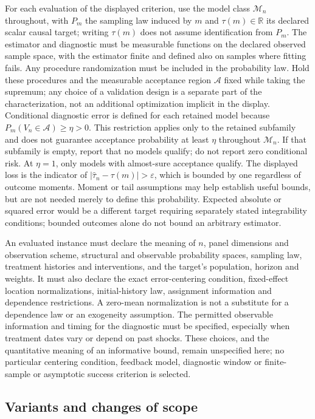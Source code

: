 \documentclass[11pt,a4paper]{article}
\newcommand{\R}{\mathbb R}
\begin{document}
For each evaluation of the displayed criterion, use the model class $\mathcal M_n$ throughout, with $P_m$ the sampling law induced by $m$ and $\tau(m)\in\R$ its declared scalar causal target; writing $\tau(m)$ does not assume identification from $P_m$. The estimator and diagnostic must be measurable functions on the declared observed sample space, with the estimator finite and defined also on samples where fitting fails. Any procedure randomization must be included in the probability law. Hold these procedures and the measurable acceptance region $\mathcal A$ fixed while taking the supremum; any choice of a validation design is a separate part of the characterization, not an additional optimization implicit in the display. Conditional diagnostic error is defined for each retained model because $P_m(V_n\in\mathcal A)\geq\eta>0$. This restriction applies only to the retained subfamily and does not guarantee acceptance probability at least $\eta$ throughout $\mathcal M_n$. If that subfamily is empty, report that no models qualify; do not report zero conditional risk. At $\eta=1$, only models with almost-sure acceptance qualify. The displayed loss is the indicator of $|\widehat\tau_n-\tau(m)|>\varepsilon$, which is bounded by one regardless of outcome moments. Moment or tail assumptions may help establish useful bounds, but are not needed merely to define this probability. Expected absolute or squared error would be a different target requiring separately stated integrability conditions; bounded outcomes alone do not bound an arbitrary estimator.

An evaluated instance must declare the meaning of $n$, panel dimensions and observation scheme, structural and observable probability spaces, sampling law, treatment histories and interventions, and the target's population, horizon and weights. It must also declare the exact error-centering condition, fixed-effect location normalizations, initial-history law, assignment information and dependence restrictions. A zero-mean normalization is not a substitute for a dependence law or an exogeneity assumption. The permitted observable information and timing for the diagnostic must be specified, especially when treatment dates vary or depend on past shocks. These choices, and the quantitative meaning of an informative bound, remain unspecified here; no particular centering condition, feedback model, diagnostic window or finite-sample or asymptotic success criterion is selected.

\subsection*{Variants and changes of scope}
\end{document}
